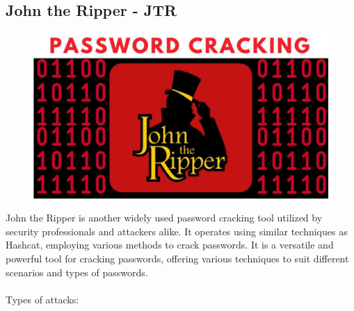 \documentclass[10pt,oneside,english,a4paper]{article}
\begin{document}
\subsection{John the Ripper - JTR}
\begin{figure}[h]
	\centering
	\includegraphics[scale = 0.20]{John_the_Ripper.jpeg}
\end{figure}

John the Ripper is another widely used password cracking tool utilized by security professionals and attackers alike. It operates using similar techniques as Hashcat, employing various methods to crack passwords. It is a versatile and powerful tool for cracking passwords, offering various techniques to suit different scenarios and types of passwords.
\\\\
Types of attacks:
\end{document}
